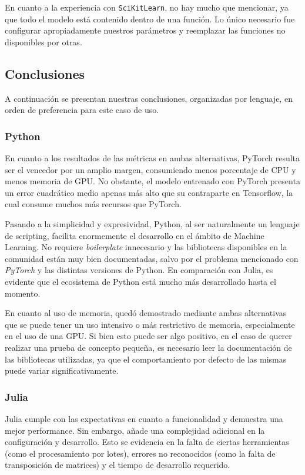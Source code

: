 \documentclass[11pt]{article}
\let\Oldsubsection\subsection
\renewcommand{\subsection}{\FloatBarrier\Oldsubsection}
\let\Oldsubsubsection\subsubsection
\renewcommand{\subsubsection}{\FloatBarrier\Oldsubsubsection}
\begin{document}
En cuanto a la experiencia con \lstinline{SciKitLearn}, no hay mucho que mencionar, ya que todo el modelo está contenido dentro de una función. Lo único necesario fue configurar apropiadamente nuestros parámetros y reemplazar las funciones no disponibles por otras.

\subsection{Conclusiones}

A continuación se presentan nuestras conclusiones, organizadas por lenguaje, en orden de preferencia para este caso de uso.

\subsubsection{Python}

En cuanto a los resultados de las métricas en ambas alternativas, PyTorch resulta ser el vencedor por un amplio margen, consumiendo menos porcentaje de CPU y menos memoria de GPU. No obstante, el modelo entrenado con PyTorch presenta un error cuadrático medio apenas más alto que su contraparte en Tensorflow, la cual consume muchos más recursos que PyTorch.

Pasando a la simplicidad y expresividad, Python, al ser naturalmente un lenguaje de scripting, facilita enormemente el desarrollo en el ámbito de Machine Learning. No requiere \textit{boilerplate} innecesario y las bibliotecas disponibles en la comunidad están muy bien documentadas, salvo por el problema mencionado con \textit{PyTorch} y las distintas versiones de Python. En comparación con Julia, es evidente que el ecosistema de Python está mucho más desarrollado hasta el momento.

En cuanto al uso de memoria, quedó demostrado mediante ambas alternativas que se puede tener un uso intensivo o más restrictivo de memoria, especialmente en el uso de una GPU. Si bien esto puede ser algo positivo, en el caso de querer realizar una prueba de concepto pequeña, es necesario leer la documentación de las bibliotecas utilizadas, ya que el comportamiento por defecto de las mismas puede variar significativamente.

\subsubsection{Julia}

Julia cumple con las expectativas en cuanto a funcionalidad y demuestra una mejor performance. Sin embargo, añade una complejidad adicional en la configuración y desarrollo. Esto se evidencia en la falta de ciertas herramientas (como el procesamiento por lotes), errores no reconocidos (como la falta de transposición de matrices) y el tiempo de desarrollo requerido.
\end{document}
